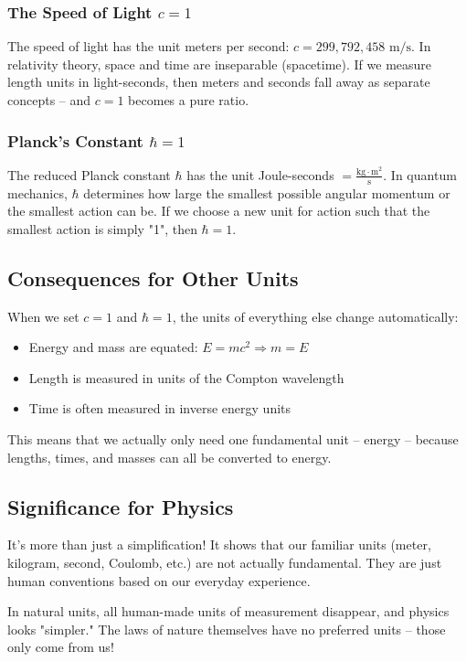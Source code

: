 \documentclass{article}
\begin{document}
\subsubsection{The Speed of Light $c = 1$}
The speed of light has the unit meters per second: $c = 299,792,458 \text{ m/s}$. In relativity theory, space and time are inseparable (spacetime). If we measure length units in light-seconds, then meters and seconds fall away as separate concepts – and $c = 1$ becomes a pure ratio.

\subsubsection{Planck's Constant $\hbar = 1$}
The reduced Planck constant $\hbar$ has the unit Joule-seconds $= \frac{\text{kg} \cdot \text{m}^2}{\text{s}}$. In quantum mechanics, $\hbar$ determines how large the smallest possible angular momentum or the smallest action can be. If we choose a new unit for action such that the smallest action is simply "1", then $\hbar = 1$.

\subsection{Consequences for Other Units}
When we set $c = 1$ and $\hbar = 1$, the units of everything else change automatically:

\begin{itemize}
	\item Energy and mass are equated: $E = mc^2 \Rightarrow m = E$
	\item Length is measured in units of the Compton wavelength
	\item Time is often measured in inverse energy units
\end{itemize}

This means that we actually only need one fundamental unit – energy – because lengths, times, and masses can all be converted to energy.

\subsection{Significance for Physics}
It's more than just a simplification! It shows that our familiar units (meter, kilogram, second, Coulomb, etc.) are not actually fundamental. They are just human conventions based on our everyday experience.

In natural units, all human-made units of measurement disappear, and physics looks "simpler." The laws of nature themselves have no preferred units – those only come from us!
\end{document}
